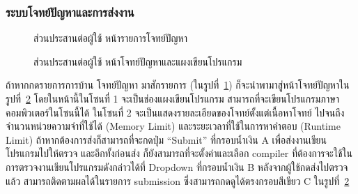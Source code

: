 \documentclass[12pt,one side,openright,a4paper]{cpe-thesis-th}
\newcommand{\thaijustify}[1]{%
  \par\hspace{30pt}\justifying
  #1
}
\begin{document}
\subsubsection{ระบบโจทย์ปัญหาและการส่งงาน}
\begin{figure}[H]
  \centering
  \caption[ส่วนประสานต่อผู้ใช้ หน้ารายการโจทย์ปัญหา]{ส่วนประสานต่อผู้ใช้ หน้ารายการโจทย์ปัญหา}
  \label{fig:new-ui-assign1}
\end{figure}
\begin{figure}[H]
  \centering
  \caption[ส่วนประสานต่อผู้ใช้ หน้าแผงเขียนโปรแกรมกับโจทย์ปัญหา]{ส่วนประสานต่อผู้ใช้ หน้าโจทย์ปัญหาและแผงเขียนโปรแกรม}
  \label{fig:new-ui-code1}
\end{figure}
\thaijustify{
  ถ้าหากกดรายการการบ้าน โจทย์ปัญหา มาสักรายการ (ในรูปที่~\ref{fig:new-ui-assign1}) ก็จะนำพามาสู่หน้าโจทย์ปัญหาในรูปที่~\ref{fig:new-ui-code1} โดยในหน้านี้ในโซนที่ 1 จะเป็นช่องแผงเขียนโปรแกรม สามารถที่จะเขียนโปรแกรมภาษาคอมพิวเตอร์ในโซนนี้ได้ ในโซนที่ 2 จะเป็นแสดงรายละเอียดของโจทย์ตั้งแต่เนื้อหาโจทย์ ไปจนถึงจำนวนหน่วยความจำที่ใช้ได้ (Memory Limit) และระยะเวลาที่ใช้ในการหาคำตอบ (Runtime Limit) ถ้าหากต้องการส่งก็สามารถที่จะกดปุ่ม “Submit” ที่กรอบน้ำเงิน A เพื่อส่งงานเขียนโปรแกรมไปให้ตรวจ และอีกทั้งก่อนส่ง ก็ยังสามารถที่จะตั้งค่าและเลือก compiler ที่ต้องการจะใช้ในการตรวจงานเขียนโปรแกรมดังกล่าวได้ที่ Dropdown ที่กรอบน้ำเงิน B หลังจากผู้ใช้กดส่งไปตรวจแล้ว สามารถติดตามผลได้ในรายการ submission ซึ่งสามารถกดดูได้ตรงกรอบสีเขียว C ในรูปที่~\ref{fig:new-ui-code1}
}
\end{document}
